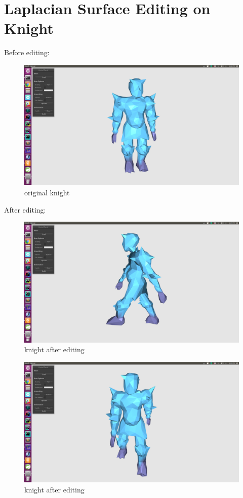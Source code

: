 \documentclass[twocolumn, a4paper]{article}
\begin{document}
\section{Laplacian Surface Editing on Knight}
Before editing:
\begin{figure}[H]
	\centering
	\includegraphics[width=1.0\linewidth]{knight_before.png}
	\caption{original knight}
\end{figure}
After editing:
\begin{figure}[H]
	\centering
	\includegraphics[width=1.0\linewidth]{knight_after1.png}
	\caption{knight after editing}
\end{figure}
\begin{figure}[H]
	\centering
	\includegraphics[width=1.0\linewidth]{knight_after2.png}
	\caption{knight after editing}
\end{figure}
\end{document}
